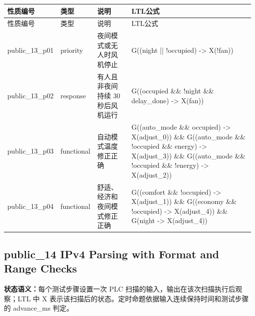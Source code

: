 \begin{longtable}{L{2.3cm}L{1.7cm}L{4.1cm}L{5.2cm}}

\toprule

性质编号 & 类型 & 说明 & LTL公式\\

\midrule

\endfirsthead

\toprule

性质编号 & 类型 & 说明 & LTL公式\\

\midrule

\endhead

{\ttfamily public\_13\_p01} & priority & 夜间模式或无人时风机停止 & {\ttfamily G((night || !occupied) -> X(!fan))}\\

{\ttfamily public\_13\_p02} & response & 有人且非夜间持续 30 秒后风机运行 & {\ttfamily G((occupied \&\& !night \&\& delay\_done) -> X(fan))}\\

{\ttfamily public\_13\_p03} & functional & 自动模式温度修正正确 & {\ttfamily G((auto\_mode \&\& occupied) -> X(adjust\_0)) \&\& G((auto\_mode \&\& !occupied \&\& energy) -> X(adjust\_3)) \&\& G((auto\_mode \&\& !occupied \&\& !energy) -> X(adjust\_2))}\\

{\ttfamily public\_13\_p04} & functional & 舒适、经济和夜间模式修正正确 & {\ttfamily G((comfort \&\& !occupied) -> X(adjust\_1)) \&\& G((economy \&\& !occupied) -> X(adjust\_4)) \&\& G(night -> X(adjust\_4))}\\

\bottomrule

\end{longtable}

\subsection{{\ttfamily public\_14} IPv4 Parsing with Format and Range Checks}

\noindent\textbf{状态语义：}每个测试步骤设置一次 PLC 扫描的输入，输出在该次扫描执行后观察；LTL 中 X 表示该扫描后的状态。定时命题依据输入连续保持时间和测试步骤的 advance\_ms 判定。

